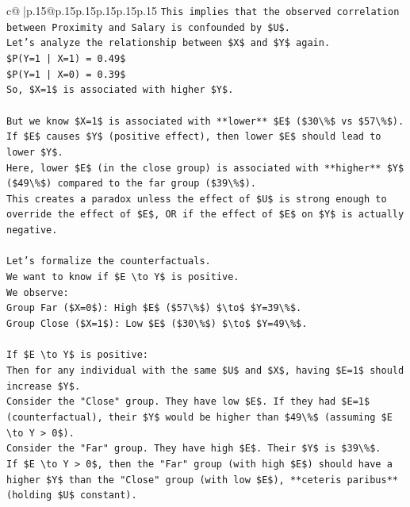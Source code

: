 \documentclass{article}
\begin{document}
{\begin{supertabular}{c@{$\;$}|p{.15\linewidth}@{}p{.15\linewidth}p{.15\linewidth}p{.15\linewidth}p{.15\linewidth}p{.15\linewidth}}
{{{\texttt{This implies that the observed correlation between Proximity and Salary is confounded by \$U\$.} \\
\texttt{Let's analyze the relationship between \$X\$ and \$Y\$ again.} \\
\texttt{\$P(Y=1 | X=1) = 0.49\$} \\
\texttt{\$P(Y=1 | X=0) = 0.39\$} \\
\texttt{So, \$X=1\$ is associated with higher \$Y\$.} \\
\\ 
\texttt{But we know \$X=1\$ is associated with **lower** \$E\$ (\$30\textbackslash{}\%\$ vs \$57\textbackslash{}\%\$).} \\
\texttt{If \$E\$ causes \$Y\$ (positive effect), then lower \$E\$ should lead to lower \$Y\$.} \\
\texttt{Here, lower \$E\$ (in the close group) is associated with **higher** \$Y\$ (\$49\textbackslash{}\%\$) compared to the far group (\$39\textbackslash{}\%\$).} \\
\texttt{This creates a paradox unless the effect of \$U\$ is strong enough to override the effect of \$E\$, OR if the effect of \$E\$ on \$Y\$ is actually negative.} \\
\\ 
\texttt{Let's formalize the counterfactuals.} \\
\texttt{We want to know if \$E \textbackslash{}to Y\$ is positive.} \\
\texttt{We observe:} \\
\texttt{Group Far (\$X=0\$): High \$E\$ (\$57\textbackslash{}\%\$) \$\textbackslash{}to\$ \$Y=39\textbackslash{}\%\$.} \\
\texttt{Group Close (\$X=1\$): Low \$E\$ (\$30\textbackslash{}\%\$) \$\textbackslash{}to\$ \$Y=49\textbackslash{}\%\$.} \\
\\ 
\texttt{If \$E \textbackslash{}to Y\$ is positive:} \\
\texttt{Then for any individual with the same \$U\$ and \$X\$, having \$E=1\$ should increase \$Y\$.} \\
\texttt{Consider the "Close" group. They have low \$E\$. If they had \$E=1\$ (counterfactual), their \$Y\$ would be higher than \$49\textbackslash{}\%\$ (assuming \$E \textbackslash{}to Y > 0\$).} \\
\texttt{Consider the "Far" group. They have high \$E\$. Their \$Y\$ is \$39\textbackslash{}\%\$.} \\
\texttt{If \$E \textbackslash{}to Y > 0\$, then the "Far" group (with high \$E\$) should have a higher \$Y\$ than the "Close" group (with low \$E\$), **ceteris paribus** (holding \$U\$ constant).} \\
}}}
\end{supertabular}}
\end{document}
